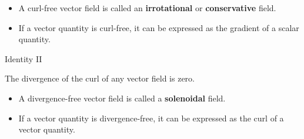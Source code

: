 \begin{ELjoin}

\begin{itemize}
\tightlist
\item
  A curl-free vector field is called an \textbf{irrotational} or \textbf{conservative} field.
\item
  If a vector quantity is curl-free, it can be expressed as the gradient of a scalar quantity.
\end{itemize}

\begin{ELimportant}{Identity II}

The divergence of the curl of any vector field is zero.

\end{ELimportant}

\end{ELjoin}

\begin{ELunit}

\begin{itemize}
\tightlist
\item
  A divergence-free vector field is called a \textbf{solenoidal} field.
\item
  If a vector quantity is divergence-free, it can be expressed as the curl of a vector quantity.
\end{itemize}

\end{ELunit}
